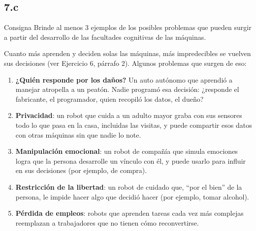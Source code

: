 \documentclass[11pt,a4paper]{article}
\begin{document}
\subsection{7.c}

\begin{enunciado}{Consigna}
Brinde al menos 3 ejemplos de los posibles problemas que pueden surgir a partir del desarrollo de las facultades cognitivas de las máquinas.
\end{enunciado}

Cuanto más aprenden y deciden solas las máquinas, más impredecibles se vuelven sus decisiones (ver Ejercicio 6, párrafo 2). Algunos problemas que surgen de eso:
\begin{enumerate}
  \item \textbf{¿Quién responde por los daños?} Un auto autónomo que aprendió a manejar atropella a un peatón. Nadie programó esa decisión: ¿responde el fabricante, el programador, quien recopiló los datos, el dueño?
  \item \textbf{Privacidad}: un robot que cuida a un adulto mayor graba con sus sensores todo lo que pasa en la casa, incluidas las visitas, y puede compartir esos datos con otras máquinas sin que nadie lo note.
  \item \textbf{Manipulación emocional}: un robot de compañía que simula emociones logra que la persona desarrolle un vínculo con él, y puede usarlo para influir en sus decisiones (por ejemplo, de compra).
  \item \textbf{Restricción de la libertad}: un robot de cuidado que, ``por el bien'' de la persona, le impide hacer algo que decidió hacer (por ejemplo, tomar alcohol).
  \item \textbf{Pérdida de empleos}: robots que aprenden tareas cada vez más complejas reemplazan a trabajadores que no tienen cómo reconvertirse.
\end{enumerate}
\end{document}
